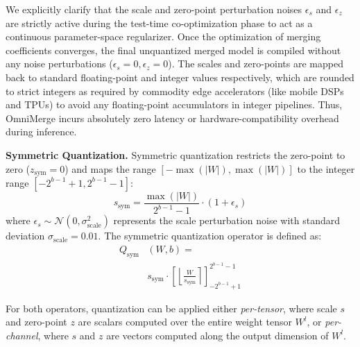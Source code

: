 We explicitly clarify that the scale and zero-point perturbation noises $\epsilon_s$ and $\epsilon_z$ are strictly active during the test-time co-optimization phase to act as a continuous parameter-space regularizer. Once the optimization of merging coefficients converges, the final unquantized merged model is compiled without any noise perturbations ($\epsilon_s = 0, \epsilon_z = 0$). The scales and zero-points are mapped back to standard floating-point and integer values respectively, which are rounded to strict integers as required by commodity edge accelerators (like mobile DSPs and TPUs) to avoid any floating-point accumulators in integer pipelines. Thus, OmniMerge incurs absolutely zero latency or hardware-compatibility overhead during inference.

\textbf{Symmetric Quantization.}
Symmetric quantization restricts the zero-point to zero ($z_{\text{sym}} = 0$) and maps the range $[-\max(|W|), \max(|W|)]$ to the integer range $[-2^{b-1}+1, 2^{b-1}-1]$:
\begin{equation}
    s_{\text{sym}} = \frac{\max(|W|)}{2^{b-1} - 1} \cdot (1 + \epsilon_s)
\end{equation}
where $\epsilon_s \sim \mathcal{N}(0, \sigma_{\text{scale}}^2)$ represents the scale perturbation noise with standard deviation $\sigma_{\text{scale}} = 0.01$. The symmetric quantization operator is defined as:
\begin{equation}
\begin{aligned}
    Q_{\text{sym}}&(W, b) = \\
    &s_{\text{sym}} \cdot \left[ \left\lfloor \frac{W}{s_{\text{sym}}} \right\rceil \right]_{-2^{b-1}+1}^{2^{b-1}-1}
\end{aligned}
\end{equation}

For both operators, quantization can be applied either \emph{per-tensor}, where scale $s$ and zero-point $z$ are scalars computed over the entire weight tensor $W^l$, or \emph{per-channel}, where $s$ and $z$ are vectors computed along the output dimension of $W^l$.

